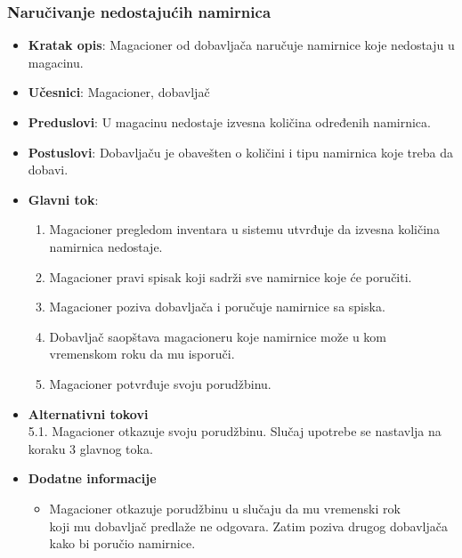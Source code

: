  \subsubsection{Naručivanje nedostajućih namirnica}
 \begin{itemize}
    \item \textbf{Kratak opis}:
   Magacioner od dobavljača naručuje namirnice koje nedostaju u magacinu.
    \item \textbf{Učesnici}:
    Magacioner, dobavljač
    \item \textbf{Preduslovi}:
    U magacinu nedostaje izvesna količina određenih namirnica.
    \item \textbf{Postuslovi}:
    Dobavljaču je obavešten o količini i tipu namirnica koje treba da dobavi. 
    \item \textbf{Glavni tok}:
    \begin{enumerate}
        \item Magacioner pregledom inventara u sistemu utvrđuje da izvesna količina namirnica nedostaje.
        \item Magacioner pravi spisak koji sadrži sve namirnice koje će poručiti.
        \item Magacioner poziva dobavljača i poručuje namirnice sa spiska.
        \item Dobavljač saopštava magacioneru koje namirnice može u kom vremenskom roku da mu isporuči.
        \item Magacioner potvrđuje svoju porudžbinu.
    \end{enumerate}
\item \textbf{Alternativni tokovi}\\
        5.1. Magacioner otkazuje svoju porudžbinu. Slučaj upotrebe se na\-stavlja na koraku 3 glavnog toka.
 
 \item \textbf{Dodatne informacije}
 \begin{itemize}
     \item 
    Magacioner otkazuje porudžbinu u slučaju da mu vremenski rok\\ koji mu dobavljač predlaže ne odgovara. Zatim poziva drugog dobavljača kako bi poručio namirnice.

 \end{itemize}
 \end{itemize}
 
